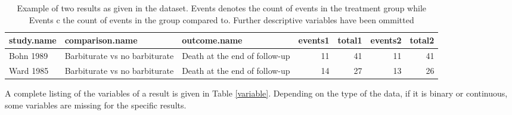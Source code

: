 \documentclass[11pt,a4paper,twoside]{book}\usepackage[]{graphicx}\usepackage[]{color}
\begin{document}
\begin{table}[ht]
\centering
\begingroup\scriptsize
\begin{tabular}{lllrrrr}
  \hline
study.name & comparison.name & outcome.name & events1 & total1 & events2 & total2 \\ 
  \hline
Bohn 1989 & Barbiturate vs no barbiturate & Death at the end of follow-up & 11 & 41 & 11 & 41 \\ 
  Ward 1985 & Barbiturate vs no barbiturate & Death at the end of follow-up & 14 & 27 & 13 & 26 \\ 
   \hline
\end{tabular}
\endgroup
\caption{Example of two results as given in the dataset. Events denotes the count of events in the treatment group while Events c the count of events in the group compared to. Further descriptive variables have been ommitted} 
\label{barbiturate.row}
\end{table}


A complete listing of the variables of a result is given in Table \ref{variable}. Depending on the type of the data, \eg if it is binary or continuous, some variables are missing for the specific results.
\end{document}
